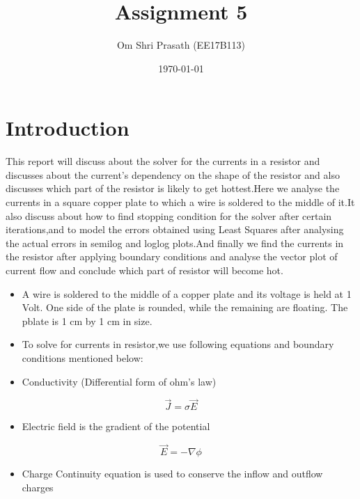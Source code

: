 \documentclass[11pt, a4paper]{article}
\title{Assignment 5} %
\author{Om Shri Prasath (EE17B113)} %
\date{\today} %
\begin{document}
	
	
\maketitle %
  \section{Introduction}
  This report will discuss about the solver for the currents in a
resistor and discusses about the current's dependency on the shape of
the resistor and also discusses which part of the resistor is likely to
get hottest.Here we analyse the currents in a square copper plate to
which a wire is soldered to the middle of it.It also discuss about how
to find stopping condition for the solver after certain iterations,and
to model the errors obtained using Least Squares after analysing the
actual errors in semilog and loglog plots.And finally we find the
currents in the resistor after applying boundary conditions and analyse
the vector plot of current flow and conclude which part of resistor will
become hot.

	\begin{itemize}
    \item
      A wire is soldered to the middle of a copper plate and its voltage is
      held at 1 Volt. One side of the plate is rounded, while the remaining
      are floating. The pblate is 1 cm by 1 cm in size.
    \item
      To solve for currents in resistor,we use following equations and
      boundary conditions mentioned below:
    \item
      Conductivity (Differential form of ohm's law)
    \end{itemize}
    
    \begin{equation}
    \vec{J} = \sigma\vec{E}
       \end{equation}
    
    \begin{itemize}
    \item
      Electric field is the gradient of the potential
    \end{itemize}
    
    \begin{equation}
    \vec{E} = -\nabla{\phi}
       \end{equation}
    
    \begin{itemize}
    \item
      Charge Continuity equation is used to conserve the inflow and outflow
      charges
    \end{itemize}
    
\end{document}

